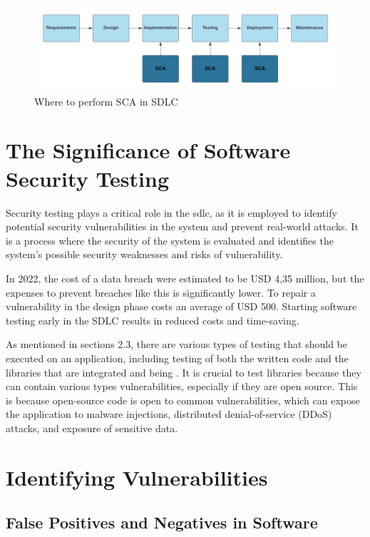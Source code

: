 \begin{figure}[htp]
    \centering
    \includegraphics[width=1\columnwidth]{Images/SCA.png}
    \caption{Where to perform SCA in SDLC}
    \label{fig:my_label}
\end{figure}

\newpage
\section{The Significance of Software Security Testing}
Security testing plays a critical role in the \acrlong{sdlc}, as it is employed to identify potential security vulnerabilities in the system and prevent real-world attacks. It is a process where the security of the system is evaluated and identifies the system's possible security weaknesses and risks of vulnerability.\cite{whysectest}

In 2022, the cost of a data breach were estimated to be USD 4,35 million\cite{databreach}, but the expenses to prevent breaches like this is significantly lower. To repair a vulnerability in the design phase costs an average of USD 500\cite{fixvulnerability}. Starting software testing early in the SDLC results in reduced costs and time-saving. 

As mentioned in sections 2.3, there are various types of testing that should be executed on an application, including testing of both the written code and the libraries that are integrated and being . It is crucial to test libraries because they can contain various types vulnerabilities, especially if they are open source. This is because open-source code is open to common vulnerabilities, which can expose the application to malware injections, distributed denial-of-service (DDoS) attacks, and exposure of sensitive data. \cite{testlibaries}

\section{Identifying Vulnerabilities}
\subsection{False Positives and Negatives in Software}

